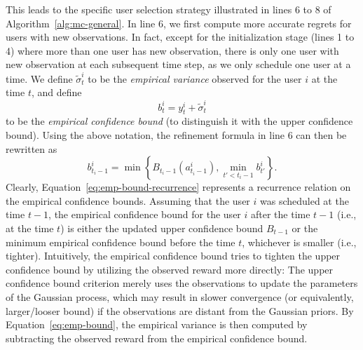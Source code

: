 \documentclass[letterpaper]{vldb}
\begin{document}
This leads to the specific user selection strategy illustrated in lines 6 to 8 of Algorithm~\ref{alg:mc-general}.
In line 6, we first compute more accurate regrets for users with new observations.
In fact, except for the initialization stage (lines 1 to 4) where more than one user has new observation, there is only one user with new observation at each subsequent time step, as we only schedule one user at a time.
We define $\tilde{\sigma}_t^i$ to be the \emph{empirical variance} observed for the user $i$ at the time $t$, and define 
\begin{equation}\label{eq:emp-bound}
b_t^i=y_t^i + \tilde{\sigma}_t^i
\end{equation}
to be the \emph{empirical confidence bound} (to distinguish it with the upper confidence bound).
Using the above notation, the refinement formula in line 6 can then be rewritten as
\begin{equation}\label{eq:emp-bound-recurrence}
b_{t_i-1}^i=\min\left\{B_{t_i-1}(a^i_{t_i-1}), \min_{t'<t_i-1} b^i_{t'}\right\}.
\end{equation}
Clearly, Equation~\ref{eq:emp-bound-recurrence} represents a recurrence relation on the empirical confidence bounds.
Assuming that the user $i$ was scheduled at the time $t-1$, the empirical confidence bound for the user $i$ after the time $t-1$ (i.e., at the time $t$) is either the updated upper confidence bound $B_{t-1}$
or the minimum empirical confidence bound before the time $t$, whichever is smaller (i.e., tighter).
Intuitively, the empirical confidence bound tries to tighten the upper confidence bound by utilizing the observed reward more directly: The upper confidence bound criterion merely uses the observations to update the parameters of the Gaussian process, which may result in slower convergence (or equivalently, larger/looser bound) if the observations are distant from the Gaussian priors.
By Equation~\ref{eq:emp-bound}, the empirical variance is then computed by subtracting the observed reward from the empirical confidence bound.
\end{document}
